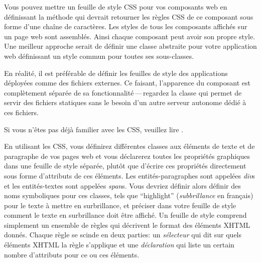 \documentclass[a4paper,10pt,twoside]{book}
\begin{document}
Vous pouvez mettre un feuille de style CSS pour vos composants web en
définissant la méthode  qui devrait retourner les règles CSS
de ce composant sous forme d'une chaîne de caractères.
Les styles de tous les composants affichés sur un page web sont
assemblés. Ainsi chaque composant peut avoir son propre style.
Une meilleur approche serait de définir une classe abstraite pour
votre application web définissant un style commun pour toutes ses
sous-classes. %

En réalité, il est préférable de définir les feuilles de style des
applications déployées comme des fichiers externes.
Ce faisant, l'apparence du composant est complètement séparée de sa
fonctionnalité\,---\,regardez la classe  qui
permet de servir des fichiers statiques sans le besoin d'un autre
serveur autonome
dédié à ces fichiers.

Si vous n'êtes pas déjà familier avec les CSS, veuillez lire
.

En utilisant les CSS, vous définirez différentes classes aux éléments
de texte et de paragraphe de vos pages web et vous déclarerez toutes
les propriétés graphiques dans une feuille de style séparée, plutôt
que d'écrire ces propriétés directement sous forme d'attributs de ces
éléments.
Les entités-paragraphes sont appelées \emph{div}s et les
entités-textes sont appelées \emph{span}s.
Vous devriez définir alors définir des noms symboliques pour ces
classes, tels que ``highlight'' (\emph{subbrillance} en français) pour
le texte à mettre en surbrillance, et préciser dans votre feuille de
style comment le texte en surbrillance doit être affiché.
Un feuille de style comprend simplement un ensemble de règles qui
décrivent le format des éléments XHTML donnés. 
Chaque règle se scinde en deux parties: un \emph{sélecteur} qui
dit sur quels éléments XHTML la règle s'applique et une
\emph{déclaration} qui liste un certain nombre d'attributs pour ce ou
ces éléments.
\end{document}
